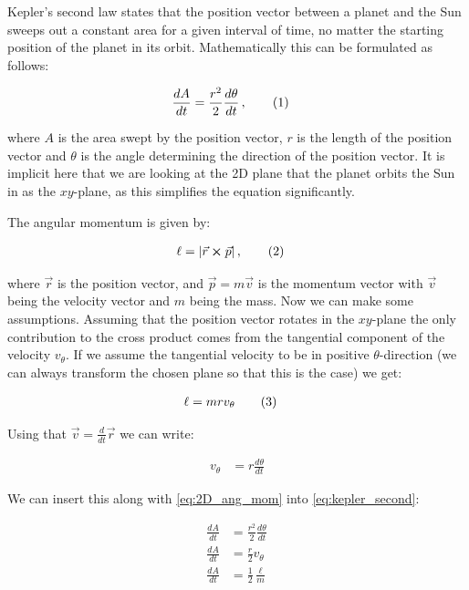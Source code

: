 \documentclass[reprint,english,notitlepage]{revtex4-1}  %
\newcommand\numberthis{\addtocounter{equation}{1}\tag{\theequation}}
\begin{document}
Kepler's second law states that the position vector between a planet and the Sun sweeps out a constant area for a given interval of time, no matter the starting position of the planet in its orbit. Mathematically this can be formulated as follows:

\begin{align*}
\frac{dA}{dt} &= \frac{r^2}{2} \frac{d\theta}{dt} \, , \numberthis \label{eq:kepler_second}
\end{align*}

where $A$ is the area swept by the position vector, $r$ is the length of the position vector and $\theta$ is the angle determining the direction of the position vector. It is implicit here that we are looking at the 2D plane that the planet orbits the Sun in as the $xy$-plane, as this simplifies the equation significantly.

The angular momentum is given by:

\begin{align*}
\ell &= |\vec{r} \cross \vec{p}| \, ,\numberthis \label{eq:ang_mom}
\end{align*}

where $\vec{r}$ is the position vector, and $\vec{p} = m \vec{v}$ is the momentum vector with $\vec{v}$ being the velocity vector and $m$ being the mass. Now we can make some assumptions. Assuming that the position vector rotates in the $xy$-plane the only contribution to the cross product comes from the tangential component of the velocity $v_\theta$. If we assume the tangential velocity to be in positive $\theta$-direction (we can always transform the chosen plane so that this is the case) we get:

\begin{align*}
\ell &= mrv_\theta \numberthis \label{eq:2D_ang_mom}
\end{align*}

Using that $\vec{v} = \frac{d}{dt} \vec{r}$ we can write:

\begin{align*}
v_\theta &= r \frac{d\theta}{dt}
\end{align*}

We can insert this along with \eqref{eq:2D_ang_mom} into \eqref{eq:kepler_second}:

\begin{align*}
\frac{dA}{dt} &= \frac{r^2}{2} \frac{d\theta}{dt} \\
\frac{dA}{dt} &= \frac{r}{2} v_\theta \\
\frac{dA}{dt} &= \frac{1}{2} \frac{\ell}{m}
\end{align*}
\end{document}
